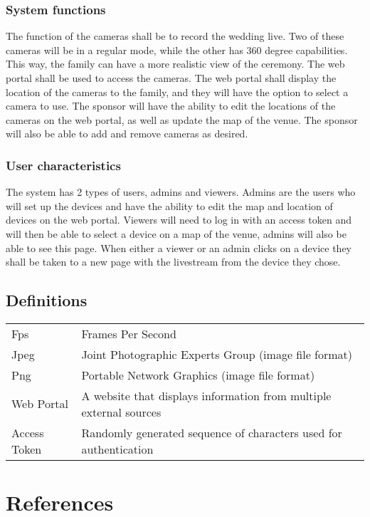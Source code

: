 \documentclass[onecolumn, draftclsnofoot,10pt, compsoc]{IEEEtran}
\begin{document}
        \subsubsection{System functions}
        The function of the cameras shall be to record the wedding live. 
        Two of these cameras will be in a regular mode, while the other has 360 degree capabilities. 
        This way, the family can have a more realistic view of the ceremony.
        The web portal shall be used to access the cameras. 
        The web portal shall display the location of the cameras to the family, and they will have the option to select a camera to use. 
        The sponsor will have the ability to edit the locations of the cameras on the web portal, as well as update the map of the venue. The sponsor will also be able to add and remove cameras as desired.
        
        \subsubsection{User characteristics}
        The system has 2 types of users, admins and viewers. 
        Admins are the users who will set up the devices and have the ability to edit the map and location of devices on the web portal.
        Viewers will need to log in with an access token and will then be able to select a device on a map of the venue, admins will also be able to see this page. 
        When either a viewer or an admin clicks on a device they shall be taken to a new page with the livestream from the device they chose.
        
    \subsection{Definitions}
        \begin{tabular}{ll}
         Fps & Frames Per Second \\ 
         Jpeg & Joint Photographic Experts Group (image file format) \\ 
         Png & Portable Network Graphics (image file format) \\
         Web Portal & A website that displays information from multiple external sources \\ 
         Access Token & Randomly generated sequence of characters used for authentication \\
        \end{tabular}

    
\section{References}
\end{document}
